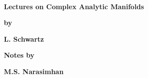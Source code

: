 ~
\thispagestyle{empty}

\vfill

\begin{center}
{\Large{\bf Lectures on Complex Analytic Manifolds}}
\medskip

{\large{\bf by}}
\medskip

{\large{\bf L. Schwartz}}
\bigskip
\bigskip

{{\bf Notes by}}
\medskip

{\large{\bf M.S. Narasimhan}}
\end{center}
\vfill
\eject
